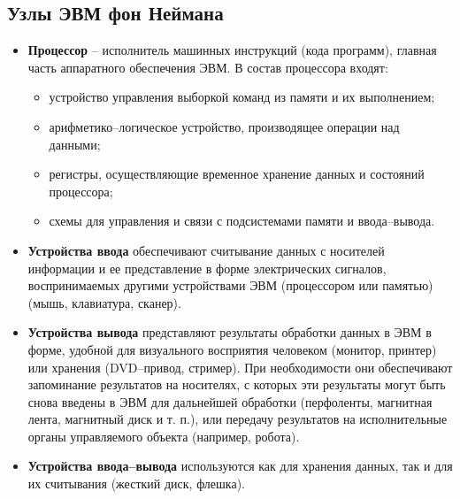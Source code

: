 \subsection{Узлы ЭВМ фон Неймана}
\begin{itemize}
  \item \textbf{Процессор} -- исполнитель машинных инструкций (кода программ), главная часть аппаратного обеспечения ЭВМ. В состав процессора входят:
      \begin{itemize}
        \item устройство управления выборкой команд из памяти и их выполнением;
        \item арифметико--логическое устройство, производящее операции над данными;
        \item регистры, осуществляющие временное хранение данных и состояний процессора;
        \item схемы для управления и связи с подсистемами памяти и ввода--вывода.
      \end{itemize}
  \item \textbf{Устройства ввода} обеспечивают считывание данных с носителей информации и ее представление в форме электрических сигналов, воспринимаемых другими устройствами ЭВМ (процессором или памятью) (мышь, клавиатура, сканер).
  \item \textbf{Устройства вывода} представляют результаты обработки данных в ЭВМ в форме, удобной для визуального восприятия человеком (монитор, принтер) или хранения (DVD--привод, стример). При необходимости они обеспечивают запоминание результатов на носителях, с которых эти результаты могут быть снова введены в ЭВМ для дальнейшей обработки (перфоленты, магнитная лента, магнитный диск и т. п.), или передачу результатов на исполнительные органы управляемого объекта (например, робота). 
  \item \textbf{Устройства ввода--вывода} используются как для хранения данных, так и для их считывания (жесткий диск, флешка).
\end{itemize}
